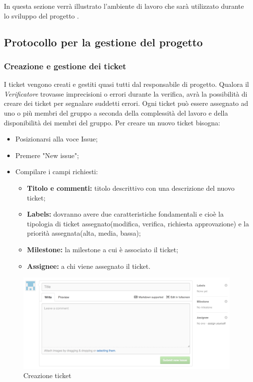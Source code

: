 In questa sezione verrà illustrato l'ambiente di lavoro che sarà utilizzato durante lo sviluppo del progetto \PROGETTO.\\

\subsection{Protocollo per la gestione del progetto}

\subsubsection{Creazione e gestione dei ticket}

I \gls{ticket} vengono creati e gestiti quasi tutti dal responsabile di progetto.
Qualora il \textit{Verificatore} trovasse imprecisioni o errori durante la verifica, avrà la possibilità di creare dei \gls{ticket} per segnalare suddetti errori.
Ogni \gls{ticket} può essere assegnato ad uno o più membri del gruppo a seconda della complessità del lavoro e della disponibilità dei membri del gruppo.
Per creare un nuovo \gls{ticket} bisogna:

\begin{itemize}
	\item Posizionarsi alla voce Issue;
	\item Premere "New issue";
	\item Compilare i campi richiesti:
	\begin{itemize}
		\item \textbf{Titolo e commenti:} titolo descrittivo con una descrizione del nuovo \gls{ticket};
		\item \textbf{Labels:} dovranno avere due caratteristiche fondamentali e cioè la tipologia di \gls{ticket} assegnato(modifica, verifica, richiesta approvazione) e la priorità assegnata(alta, media, bassa);
		\item \textbf{\gls{Milestone}:} la \gls{milestone} a cui è associato il \gls{ticket};
		\item \textbf{Assignee:} a chi viene assegnato il \gls{ticket}.
	\end{itemize}
\end{itemize}
\begin{figure}[h]
	\centering
	\includegraphics[width=0.7\linewidth]{img/ticket}
	\caption[Creazione ticket]{Creazione \gls{ticket}}
	\label{fig:ticket}
\end{figure}


